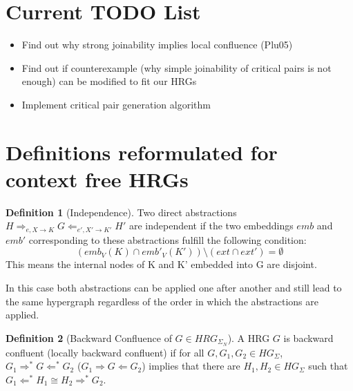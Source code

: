 \documentclass[12pt]{article}
\theoremstyle{definition}
\newtheorem{definition}{Definition}
\begin{document}
\maketitle

\begin{abstract}
In general hypergraph transformation systems confluence and backwards confluence is not decidable. This thesis explores if it is possible to decide backwards confluence for \emph{context-free} hyperedge replacement grammars (HRGs).
Additionally it shows heuristics to complete HRGs by adding additional rules that lead to a backwards confluent HRG.
\end{abstract}

\section{Current TODO List}
\begin{itemize}
\item Find out why strong joinability implies local confluence (Plu05)
\item Find out if counterexample (why simple joinability of critical pairs is not enough) can be modified to fit our HRGs
\item Implement critical pair generation algorithm
\end{itemize}

\section{Definitions reformulated for context free HRGs}
\begin{definition}[Independence]
Two direct abstractions $H \Rightarrow_{e, X \rightarrow K} G \Leftarrow_{e', X' \rightarrow K'} H' $ are independent if the two embeddings $emb$ and $emb'$ corresponding to these abstractions fulfill the following condition:
$$(emb_V(K) \cap emb'_V(K')) \setminus (ext \cap ext') = \emptyset$$
This means the internal nodes of K and K' embedded into G are disjoint.

In this case both abstractions can be applied one after another and still lead to the same hypergraph regardless of the order in which the abstractions are applied. 
\end{definition}

\begin{definition}[Backward Confluence of $G \in HRG_{\Sigma_N}$]
A HRG $G$ is backward confluent (locally backward confluent) if for all $G, G_1, G_2 \in HG_\Sigma$, $G_1 \Rightarrow^* G \Leftarrow^* G_2$ ($G_1 \Rightarrow G \Leftarrow G_2$) implies that there are $H_1, H_2 \in HG_\Sigma$ such that $G_1 \Leftarrow^*H_1 \cong H_2 \Rightarrow^* G_2$.
\end{definition}
\end{document}
